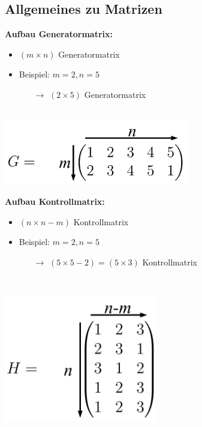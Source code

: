 \newpage

\subsection{Allgemeines zu Matrizen}

\begin{minipage}{0.5\textwidth}
\textbf{Aufbau Generatormatrix:}

\begin{itemize}
\item $(m \times n)$ Generatormatrix
\item Beispiel: $m = 2, n = 5$
\begin{itemize}
\item[$\rightarrow$] $(2 \times 5)$ Generatormatrix
\end{itemize}
\end{itemize}\
\\

\includegraphics[width=0.6\textwidth]{graphics/generatormatrix.png}\\
\end{minipage}
\hfill
\begin{minipage}{0.5\textwidth}
\textbf{Aufbau Kontrollmatrix:}

\begin{itemize}
\item $(n \times n-m)$ Kontrollmatrix
\item Beispiel: $m= 2, n = 5$
\begin{itemize}
\item[$\rightarrow$] $(5 \times 5-2) = (5 \times 3)$ Kontrollmatrix
\end{itemize}
\end{itemize}\

\includegraphics[width=0.5\textwidth]{graphics/kontrollmatrix.png}
\end{minipage}

